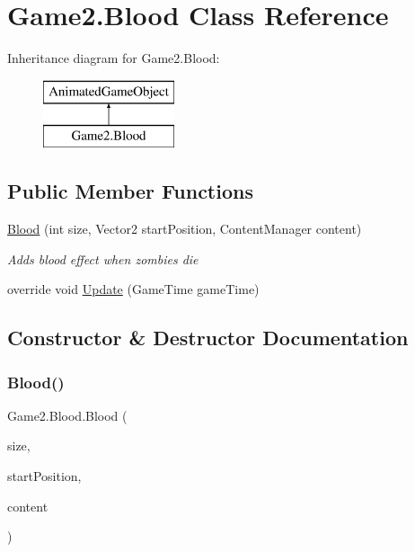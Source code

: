 \hypertarget{class_game2_1_1_blood}{}\section{Game2.\+Blood Class Reference}
\label{class_game2_1_1_blood}
Inheritance diagram for Game2.\+Blood\+:\begin{figure}[H]
\begin{center}
\leavevmode
\includegraphics[height=2.000000cm]{class_game2_1_1_blood}
\end{center}
\end{figure}
\subsection*{Public Member Functions}
\begin{DoxyCompactItemize}
\item 
\mbox{\hyperlink{class_game2_1_1_blood_a10ecab2233dc1762d207a443ec1d0e93}{Blood}} (int size, Vector2 start\+Position, Content\+Manager content)
\begin{DoxyCompactList}\small\item\em Adds blood effect when zombies die \end{DoxyCompactList}\item 
override void \mbox{\hyperlink{class_game2_1_1_blood_a3a041247d506eb27de8daafa49daa0cd}{Update}} (Game\+Time game\+Time)
\end{DoxyCompactItemize}


\subsection{Constructor \& Destructor Documentation}
\mbox{\label{class_game2_1_1_blood_a10ecab2233dc1762d207a443ec1d0e93}} 
\subsubsection{\texorpdfstring{Blood()}{Blood()}}
{\footnotesize\ttfamily Game2.\+Blood.\+Blood (\begin{DoxyParamCaption}\item[{int}]{size,  }\item[{Vector2}]{start\+Position,  }\item[{Content\+Manager}]{content }\end{DoxyParamCaption})}



